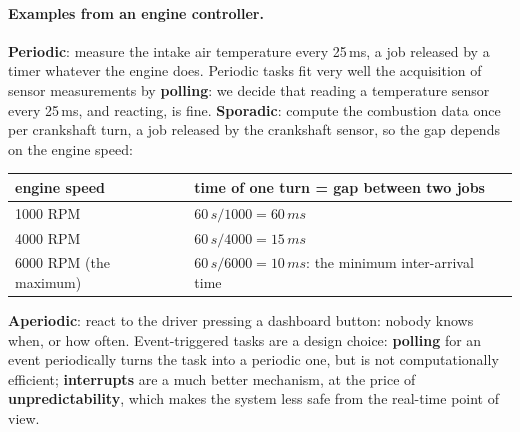 \paragraph{Examples from an engine controller.} \textbf{Periodic}: measure the intake air temperature every 25\,ms, a job released by a timer whatever the engine does. Periodic tasks fit very well the acquisition of sensor measurements by \textbf{polling}: we decide that reading a temperature sensor every 25\,ms, and reacting, is fine. \textbf{Sporadic}: compute the combustion data once per crankshaft turn, a job released by the crankshaft sensor, so the gap depends on the engine speed:
    \begin{center}
    \begin{tabular}{l l}
    \hline
    \textbf{engine speed} & \textbf{time of one turn = gap between two jobs} \\
    \hline
    1000 RPM & $60\,s / 1000 = 60\,ms$ \\
    4000 RPM & $60\,s / 4000 = 15\,ms$ \\
    6000 RPM (the maximum) & $60\,s / 6000 = 10\,ms$: the minimum inter-arrival time \\
    \hline
    \end{tabular}
    \end{center}
\textbf{Aperiodic}: react to the driver pressing a dashboard button: nobody knows when, or how often. Event-triggered tasks are a design choice: \textbf{polling} for an event periodically turns the task into a periodic one, but is not computationally efficient; \textbf{interrupts} are a much better mechanism, at the price of \textbf{unpredictability}, which makes the system less safe from the real-time point of view.

